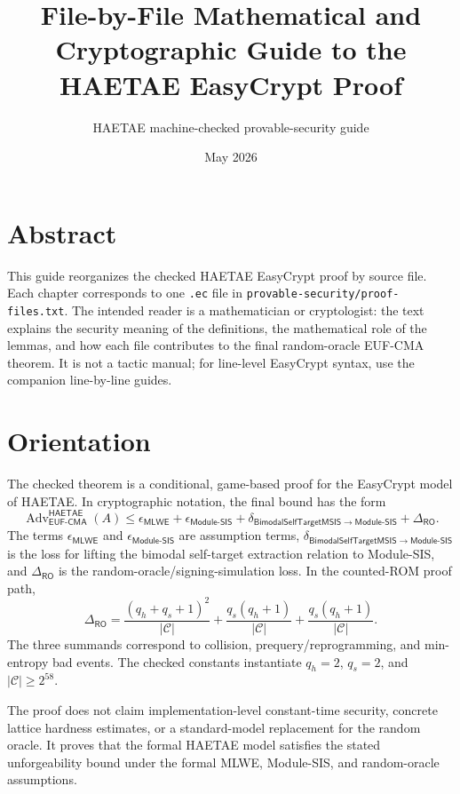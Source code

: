 \documentclass[11pt]{report}
\title{File-by-File Mathematical and Cryptographic Guide to the HAETAE EasyCrypt Proof}
\author{HAETAE machine-checked provable-security guide}
\date{May 2026}
\newcommand{\file}[1]{\nolinkurl{#1}}
\newcommand{\Adv}{\operatorname{Adv}}
\newcommand{\ROM}{\mathsf{RO}}
\newcommand{\HAETAE}{\mathsf{HAETAE}}
\newcommand{\EUFCMA}{\mathsf{EUF\mbox{-}CMA}}
\newcommand{\MLWE}{\mathsf{MLWE}}
\newcommand{\MSIS}{\mathsf{Module\mbox{-}SIS}}
\newcommand{\BMSIS}{\mathsf{BimodalSelfTargetMSIS}}
\theoremstyle{definition}
\theoremstyle{plain}
\theoremstyle{definition}
\begin{document}
\maketitle
\setcounter{page}{2}

\chapter*{Abstract}
This guide reorganizes the checked HAETAE EasyCrypt proof by source file.  Each
chapter corresponds to one \file{.ec} file in
\file{provable-security/proof-files.txt}.  The intended reader is a
mathematician or cryptologist: the text explains the security meaning of the
definitions, the mathematical role of the lemmas, and how each file contributes
to the final random-oracle EUF-CMA theorem.  It is not a tactic manual; for
line-level EasyCrypt syntax, use the companion line-by-line guides.

\tableofcontents
\clearpage
{}

\chapter*{Orientation}

The checked theorem is a conditional, game-based proof for the EasyCrypt model
of HAETAE.  In cryptographic notation, the final bound has the form
\[
  \Adv_{\EUFCMA}^{\HAETAE}(A)
  \le
  \epsilon_{\MLWE}
  + \epsilon_{\MSIS}
  + \delta_{\BMSIS\to\MSIS}
  + \Delta_{\ROM}.
\]
The terms \(\epsilon_{\MLWE}\) and \(\epsilon_{\MSIS}\) are assumption terms,
\(\delta_{\BMSIS\to\MSIS}\) is the loss for lifting the bimodal
self-target extraction relation to Module-SIS, and \(\Delta_{\ROM}\) is the
random-oracle/signing-simulation loss.  In the counted-ROM proof path,
\[
  \Delta_{\ROM}
  =
  \frac{(q_h+q_s+1)^2}{|\mathcal{C}|}
  + \frac{q_s(q_h+1)}{|\mathcal{C}|}
  + \frac{q_s(q_h+1)}{|\mathcal{C}|}.
\]
The three summands correspond to collision, prequery/reprogramming, and
min-entropy bad events.  The checked constants instantiate
\(q_h=2\), \(q_s=2\), and \(|\mathcal{C}|\ge 2^{58}\).

The proof does not claim implementation-level constant-time security, concrete
lattice hardness estimates, or a standard-model replacement for the random
oracle.  It proves that the formal HAETAE model satisfies the stated
unforgeability bound under the formal MLWE, Module-SIS, and random-oracle
assumptions.
\end{document}
